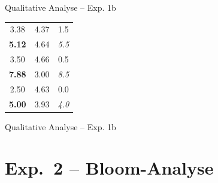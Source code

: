 \documentclass[usenames, dvipsnames, aspectratio=32]{beamer}
\begin{document}
\begin{frame}{Qualitative Analyse -- Exp. 1b}
\begin{table}[htbp]
\begin{minipage}[t]{0.31625\linewidth}
{\begin{tabular}{ccc}
            \midrule
            3.38 & 4.37 & 1.5 \\
            \textbf{5.12} & 4.64 & \textit{5.5} \\
            \midrule
            3.50 & 4.66 & 0.5 \\
            \textbf{7.88} & 3.00 & \textit{8.5} \\
            \midrule
            2.50 & 4.63 & 0.0 \\
            \textbf{5.00} & 3.93 & \textit{4.0} \\
            \bottomrule
        \end{tabular}}
    \end{minipage}
\end{table}
\end{frame}

\begin{frame}{Qualitative Analyse -- Exp. 1b}
\begin{table}[H]
   \centering
   \caption{Inter-Rater Agreement Analyse (Exp1b).}
   \label{tab:iaa-staff-1b}
\end{table}
\end{frame}

\section{Exp.\ 2 -- Bloom-Analyse}
\end{document}

